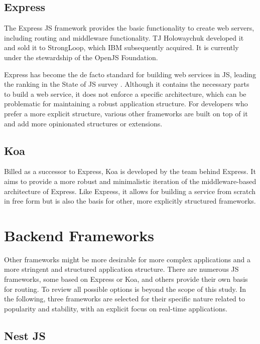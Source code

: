 \subsection{Express}

The Express JS framework provides the basic functionality to create web servers, including routing and middleware functionality. TJ Holowaychuk developed it and sold it to StrongLoop, which IBM subsequently acquired. It is currently under the stewardship of the OpenJS Foundation.

Express has become the de facto standard for building web services in JS, leading the ranking in the State of JS survey \parencite{mostUsedBackendFrameworks22}. Although it contains the necessary parts to build a web service, it does not enforce a specific architecture, which can be problematic for maintaining a robust application structure. For developers who prefer a more explicit structure, various other frameworks are built on top of it and add more opinionated structures or extensions.

\subsection{Koa}

Billed as a successor to Express, Koa is developed by the team behind Express. It aims to provide a more robust and minimalistic iteration of the middleware-based architecture of Express. Like Express, it allows for building a service from scratch in free form but is also the basis for other, more explicitly structured frameworks.


\section{Backend Frameworks}

Other frameworks might be more desirable for more complex applications and a more stringent and structured application structure. There are numerous \ac{JS} frameworks, some based on Express or Koa, and others provide their own basis for routing. To review all possible options is beyond the scope of this study. In the following, three frameworks are selected for their specific nature related to popularity and stability, with an explicit focus on real-time applications.



\subsection{Nest JS}

